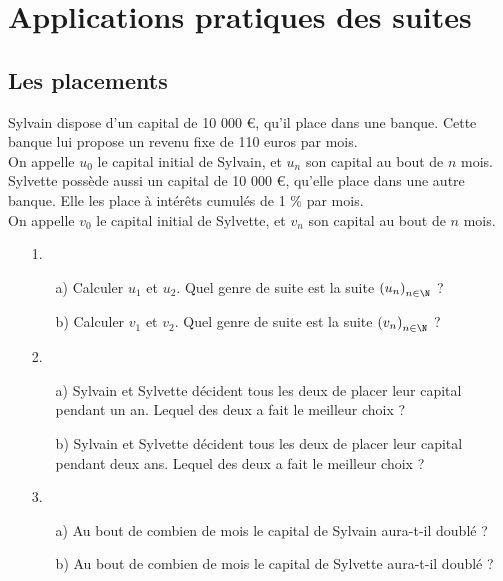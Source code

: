 \ifdefined\COMPLETE
\else
    
    
    \usepackage{texgraph}
    
    
\fi


\section{Applications pratiques des suites}

\subsection{Les placements}

Sylvain dispose d'un capital de 10 000 €, qu'il place dans une banque. Cette banque lui propose un revenu fixe de 110 euros par mois. \\ On appelle $u_0$ le capital initial de Sylvain, et $u_n$ son capital au bout de $n$ mois. \\

Sylvette possède aussi un capital de 10 000 €, qu'elle place dans une autre banque. Elle les place à intérêts cumulés de 1 \% par mois. \\ On appelle $v_0$ le capital initial de Sylvette, et $v_n$ son capital au bout de $n$ mois. \\

\begin{itemize}
\item[1.]
\begin{itemize}
\item[a)] Calculer $u_1$ et $u_2$. Quel genre de suite est la suite $\left(u_n\right)_{n \in \N} $ ? \\
\item[b)] Calculer $v_1$ et $v_2$. Quel genre de suite est la suite $\left(v_n\right)_{n \in \N} $ ? \\
\end{itemize}
\item[2.]
\begin{itemize}
\item[a)] Sylvain et Sylvette décident tous les deux de placer leur capital pendant un an. Lequel des deux a fait le meilleur choix ? \\
\item[b)] Sylvain et Sylvette décident tous les deux de placer leur capital pendant deux ans. Lequel des deux a fait le meilleur choix ? \\
\end{itemize}
\item[3.] 
\begin{itemize}
\item[a)] Au bout de combien de mois le capital de Sylvain aura-t-il doublé ?
\item[b)] Au bout de combien de mois le capital de Sylvette aura-t-il doublé ?
\end{itemize} 
\end{itemize}

